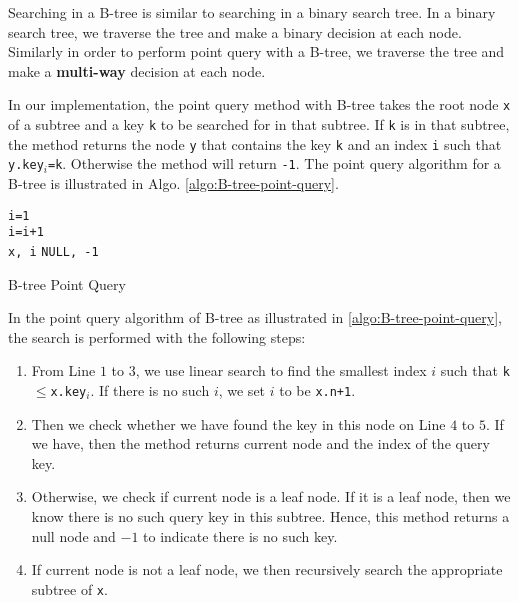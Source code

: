 Searching in a B-tree is similar to searching in a binary search tree. In a binary search tree, we traverse the tree and make a binary decision at each node. Similarly in order to perform point query with a B-tree, we traverse the tree and make a \textbf{multi-way} decision at each node.

In our implementation, the point query method with B-tree takes the root node \texttt{x} of a subtree and a key \texttt{k} to be searched for in that subtree. If \texttt{k} is in that subtree, the method returns the node \texttt{y} that contains the key \texttt{k} and an index \texttt{i} such that \texttt{y.key$_i$=k}. Otherwise the method will return \texttt{-1}. The point query algorithm for a B-tree is illustrated in Algo. \ref{algo:B-tree-point-query}.

\begin{algorithm}
\SetAlgoLined
{}

\texttt{i=1} \\
 {
	\texttt{i=i+1} \\
	 {
		\Return \texttt{x, i}
	}
	 {
		\Return \texttt{NULL, -1}
	}
}

\caption{B-tree Point Query}
\label{algo:B-tree-point-query}
\end{algorithm}

In the point query algorithm of B-tree as illustrated in \ref{algo:B-tree-point-query}, the search is performed with the following steps:

\begin{enumerate}
	\item From Line $1$ to $3$, we use linear search to find the smallest index $i$ such that \texttt{k$\leq$x.key$_i$}. If there is no such $i$, we set $i$ to be \texttt{x.n+1}.
	\item Then we check whether we have found the key in this node on Line $4$ to $5$. If we have, then the method returns current node and the index of the query key.
	\item Otherwise, we check if current node is a leaf node. If it is a leaf node, then we know there is no such query key in this subtree. Hence, this method returns a null node and $-1$ to indicate there is no such key.
	\item If current node is not a leaf node, we then recursively search the appropriate subtree of \texttt{x}.
\end{enumerate}

